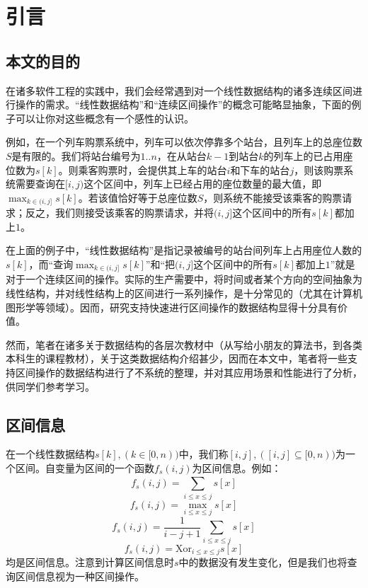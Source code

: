 \documentclass{cjc}
\begin{document}
\maketitle

\section{引言}

\subsection{本文的目的}

在诸多软件工程的实践中，我们会经常遇到对一个线性数据结构的诸多连续区间进行操作的需求。“线性数据结构”和“连续区间操作”的概念可能略显抽象，下面的例子可以让你对这些概念有一个感性的认识。

例如，在一个列车购票系统中，列车可以依次停靠多个站台，且列车上的总座位数$S$是有限的。我们将站台编号为$1..n$，在从站台$k-1$到站台$k$的列车上的已占用座位数为$s[k]$。则乘客购票时，会提供其上车的站台$i$和下车的站台$j$，则该购票系统需要查询在$[i,j)$这个区间中，列车上已经占用的座位数量的最大值，即$\max_{k\in(i,j]}s[k]$。若该值恰好等于总座位数$S$，则系统不能接受该乘客的购票请求；反之，我们则接受该乘客的购票请求，并将$(i,j]$这个区间中的所有$s[k]$都加上$1$。

在上面的例子中，“线性数据结构”是指记录被编号的站台间列车上占用座位人数的$s[k]$，而“查询$\max_{k\in(i,j]}s[k]$”和“把$(i,j]$这个区间中的所有$s[k]$都加上$1$”就是对于一个连续区间的操作。实际的生产需要中，将时间或者某个方向的空间抽象为线性结构，并对线性结构上的区间进行一系列操作，是十分常见的（尤其在计算机图形学等领域）。因而，研究支持快速进行区间操作的数据结构显得十分具有价值。

然而，笔者在诸多关于数据结构的各层次教材中（从写给小朋友的算法书，到各类本科生的课程教材），关于这类数据结构介绍甚少，因而在本文中，笔者将一些支持区间操作的数据结构进行了不系统的整理，并对其应用场景和性能进行了分析，供同学们参考学习。

\subsection{区间信息}

在一个线性数据结构$s[k],(k\in [0,n))$中，我们称$[i,j],([i,j]\subseteq [0,n))$为一个区间。自变量为区间的一个函数$f_s(i,j)$为区间信息。例如：
\begin{equation*}
  f_s(i,j) = \sum_{i\leq x \leq j}^{}s[x]
\end{equation*}
\begin{equation*}
  f_s(i,j) = \max_{i\leq x \leq j}s[x]
\end{equation*}
\begin{equation*}
  f_s(i,j) = \frac{1}{i-j+1}\sum_{i\leq x \leq j}^{}s[x]
\end{equation*}
\begin{equation*}
  f_s(i,j) = \text{Xor} _{i\leq x \leq j}s[x]
\end{equation*}
均是区间信息。注意到计算区间信息时$s$中的数据没有发生变化，但是我们也将查询区间信息视为一种区间操作。
\end{document}
